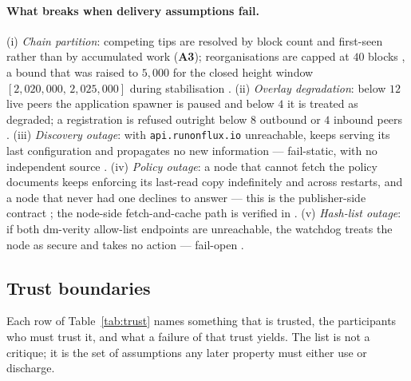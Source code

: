 \paragraph{What breaks when delivery assumptions fail.}
\shipped (i) \emph{Chain partition}: competing tips are resolved by block count and first-seen rather
than by accumulated work (\textbf{A3}); reorganisations are capped at $40$ blocks
, a bound that was raised to $5{,}000$ for the closed height window
$[2{,}020{,}000,\,2{,}025{,}000]$ during \PoN{} stabilisation
. (ii) \emph{Overlay degradation}: below $12$ live peers the
application spawner is paused and below $4$ it is treated as degraded; a registration is refused
outright below $8$ outbound or $4$ inbound peers
. (iii) \emph{Discovery outage}: with
\texttt{api.\allowbreak{}runonflux.\allowbreak{}io} unreachable, \FDM{} keeps serving its last configuration and propagates no
new information --- fail-static, with no independent source
. (iv) \emph{Policy outage}: a
node that cannot fetch the policy documents keeps enforcing its last-read copy indefinitely and
across restarts, and a node that never had one declines to answer --- this is the publisher-side
contract ; the node-side fetch-and-cache path is
verified in \FluxOS{} .
(v) \emph{Hash-list outage}: if both dm-verity
allow-list endpoints are unreachable, the \ArcaneOS{} watchdog treats the node as secure and takes no
action --- fail-open .

\subsection{Trust boundaries}
\label{sec:model:trust}

Each row of Table~\ref{tab:trust} names something that is trusted, the participants who must trust
it, and what a failure of that trust yields. The list is not a critique; it is the set of
assumptions any later property must either use or discharge.

